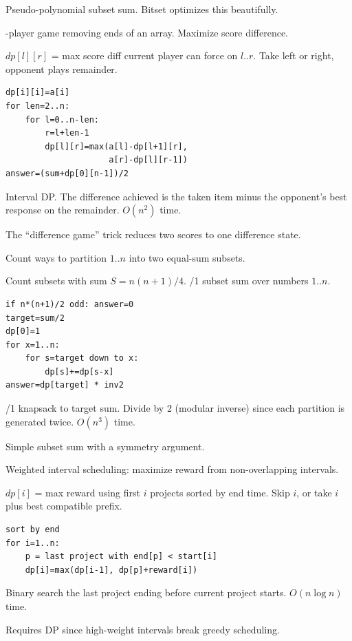 \Analysis Pseudo-polynomial subset sum. Bitset optimizes this beautifully.


-player game removing ends of an array. Maximize score difference.

\State $dp[l][r]$ = max score diff current player can force on $l..r$.
\Trans Take left or right, opponent plays remainder.
\begin{lstlisting}
dp[i][i]=a[i]
for len=2..n:
    for l=0..n-len:
        r=l+len-1
        dp[l][r]=max(a[l]-dp[l+1][r],
                     a[r]-dp[l][r-1])
answer=(sum+dp[0][n-1])/2
\end{lstlisting}

\Solution Interval DP. The difference achieved is the taken item minus the opponent's best response on the remainder. $O(n^2)$ time.

\Analysis The ``difference game'' trick reduces two scores to one difference state.


\Problem Count ways to partition $1..n$ into two equal-sum subsets.

\State Count subsets with sum $S=n(n+1)/4$.
/1 subset sum over numbers $1..n$.
\begin{lstlisting}
if n*(n+1)/2 odd: answer=0
target=sum/2
dp[0]=1
for x=1..n:
    for s=target down to x:
        dp[s]+=dp[s-x]
answer=dp[target] * inv2
\end{lstlisting}

/1 knapsack to target sum. Divide by 2 (modular inverse) since each partition is generated twice. $O(n^3)$ time.

\Analysis Simple subset sum with a symmetry argument.


\Problem Weighted interval scheduling: maximize reward from non-overlapping intervals.

\State $dp[i]$ = max reward using first $i$ projects sorted by end time.
\Trans Skip $i$, or take $i$ plus best compatible prefix.
\begin{lstlisting}
sort by end
for i=1..n:
    p = last project with end[p] < start[i]
    dp[i]=max(dp[i-1], dp[p]+reward[i])
\end{lstlisting}

\Solution Binary search the last project ending before current project starts. $O(n \log n)$ time.

\Analysis Requires DP since high-weight intervals break greedy scheduling.

